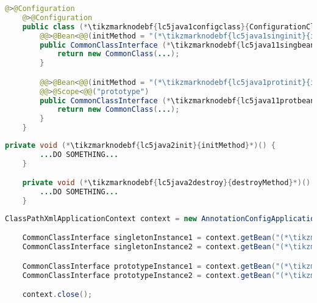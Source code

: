 \begin{lstlisting}[language=Java, title={Configuration class}]@>@Configuration
    @>@Configuration
    public class (*\tikzmarknodebf{lc5java1configclass}{ConfigurationClass}*) {
        @@>@Bean<@@(initMethod = "(*\tikzmarknodebf{lc5java1singinit}{initMethod}[ForestGreen]*)", destroyMethod = "(*\tikzmarknodebf{lc5java1singdestroy}{destroyMethod}[ForestGreen]*)")
        public CommonClassInterface (*\tikzmarknodebf{lc5java11singbeanid}{singletonBeanMethod}*)() {
            return new CommonClass(...);
        }

        @@>@Bean<@@(initMethod = "(*\tikzmarknodebf{lc5java1protinit}{initMethod}[ForestGreen]*)", destroyMethod = "(*\tikzmarknodebf{lc5java1protdestroy}{destroyMethod}[ForestGreen]*)")
        @@>@Scope<@@("prototype")
        public CommonClassInterface (*\tikzmarknodebf{lc5java11protbeanid}{prototypeBeanMethod}*)() {
            return new CommonClass(...);
        }
    }
\end{lstlisting}
\begin{lstlisting}[language=Java, title={Snippet of a common bean class}]
    private void (*\tikzmarknodebf{lc5java2init}{initMethod}*)() {
        ...DO SOMETHING...
    }

    private void (*\tikzmarknodebf{lc5java2destroy}{destroyMethod}*)() {
        ...DO SOMETHING...
    }
\end{lstlisting}
\begin{lstlisting}[language=Java, title={Usage}]
    ClassPathXmlApplicationContext context = new AnnotationConfigApplicationContext((*\tikzmarknodebf{lc5java3configclass}{ConfigurationClass}*).class);

    CommonClassInterface singletonInstance1 = context.getBean("(*\tikzmarknodebf{lc5java3singbeanid1}{singletonBeanMethod}[ForestGreen]*)", CommonClassInterface.class);
    CommonClassInterface singletonInstance2 = context.getBean("(*\tikzmarknodebf{lc5java3singbeanid2}{singletonBeanMethod}[ForestGreen]*)", CommonClassInterface.class);

    CommonClassInterface prototypeInstance1 = context.getBean("(*\tikzmarknodebf{lc5java3protbeanid1}{prototypeBeanMethod}[ForestGreen]*)", CommonClassInterface.class);
    CommonClassInterface prototypeInstance2 = context.getBean("(*\tikzmarknodebf{lc5java3protbeanid2}{prototypeBeanMethod}[ForestGreen]*)", CommonClassInterface.class);

    context.close();
\end{lstlisting}
